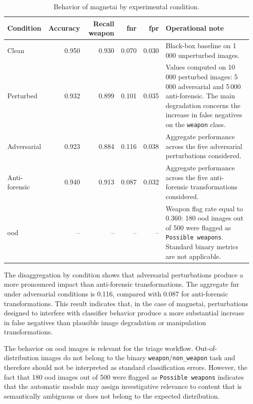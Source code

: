 \begin{table}[H]
\centering
\caption{Behavior of \gls{magnetai} by experimental condition.}
\label{tab:results-magnet-condition-metrics}
\small
\begin{tabularx}{\textwidth}{@{}l r r r r X@{}}
\toprule
\textbf{Condition} &
\textbf{Accuracy} &
\textbf{Recall weapon} &
\textbf{\gls{fnr}} &
\textbf{\gls{fpr}} &
\textbf{Operational note} \\
\midrule

Clean &
0.950 &
0.930 &
0.070 &
0.030 &
Black-box baseline on 1\,000 unperturbed images. \\

Perturbed &
0.932 &
0.899 &
0.101 &
0.035 &
Values computed on 10\,000 perturbed images: 5\,000 adversarial and 5\,000
anti-forensic. The main degradation concerns the increase in false negatives on
the \texttt{weapon} class. \\

Adversarial &
0.923 &
0.884 &
0.116 &
0.038 &
Aggregate performance across the five adversarial perturbations considered. \\

Anti-forensic &
0.940 &
0.913 &
0.087 &
0.032 &
Aggregate performance across the five anti-forensic transformations considered. \\

\gls{ood} &
-- &
-- &
-- &
-- &
Weapon flag rate equal to 0.360: 180 \gls{ood} images out of 500 were flagged
as \texttt{Possible weapons}. Standard binary metrics are not applicable. \\

\bottomrule
\end{tabularx}
\end{table}

The disaggregation by condition shows that adversarial perturbations produce a
more pronounced impact than anti-forensic transformations. The aggregate
\gls{fnr} under adversarial conditions is 0.116, compared with 0.087 for
anti-forensic transformations. This result indicates that, in the case of
\gls{magnetai}, perturbations designed to interfere with classifier behavior
produce a more substantial increase in false negatives than plausible image
degradation or manipulation transformations.

The behavior on \gls{ood} images is relevant for the triage workflow.
Out-of-distribution images do not belong to the binary
\texttt{weapon}/\texttt{non\_weapon} task and therefore should not be
interpreted as standard classification errors. However, the fact that 180
\gls{ood} images out of 500 were flagged as \texttt{Possible weapons} indicates
that the automatic module may assign investigative relevance to content that is
semantically ambiguous or does not belong to the expected distribution.

